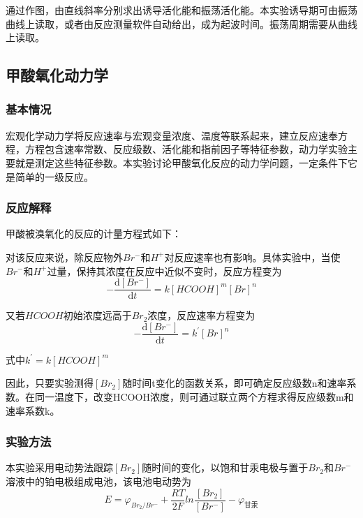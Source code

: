 \documentclass[12pt,hyperref,a4paper,UTF8]{ctexart}
\begin{document}
通过作图，由直线斜率分别求出诱导活化能和振荡活化能。本实验诱导期可由振荡曲线上读取，或者由反应测量软件自动给出，成为起波时间。振荡周期需要从曲线上读取。

\clearpage

\subsection{甲酸氧化动力学}
\subsubsection{基本情况}
宏观化学动力学将反应速率与宏观变量浓度、温度等联系起来，建立反应速奉方程，方程包含速率常数、反应级数、活化能和指前因子等特征参数，动力学实验主要就是测定这些特征参数。本实验讨论甲酸氧化反应的动力学问题，一定条件下它是简单的一级反应。

\subsubsection{反应解释}
甲酸被溴氧化的反应的计量方程式如下：

对该反应来说，除反应物外$Br^{-}$和$H^{+}$对反应速率也有影响。具体实验中，当使$Br^{-}$和$H^{+}$过量，保持其浓度在反应中近似不变时，反应方程变为
\begin{equation}
    - \frac{\mathrm{d}{[Br^{-}]}}{\mathrm{d}t} = k {[HCOOH]}^{m}{[Br]}^n 
\end{equation}

又若$HCOOH$初始浓度远高于$Br_2$浓度，反应速率方程变为
\begin{equation}
    - \frac{\mathrm{d}{[Br^{-}]}}{\mathrm{d}t} = k^{'}{[Br]}^n
\end{equation}

式中$k^{'} = k {[HCOOH]}^{m}$

因此，只要实验测得$[Br_2]$随时间t变化的函数关系，即可确定反应级数n和速率系数。在同一温度下，改变HCOOH浓度，则可通过联立两个方程求得反应级数m和速率系数k。

\subsubsection{实验方法}
本实验采用电动势法跟踪$[Br_2]$随时间的变化，以饱和甘汞电极与置于$Br_2$和$Br^{-}$溶液中的铂电极组成电池，该电池电动势为
\begin{equation}
    E = \varphi _{{Br_2}/{Br^-}} + \frac{RT}{2F}ln\frac{[Br_2]}{[Br^-]}- \varphi _{\text{甘汞}}
\end{equation}
\end{document}

